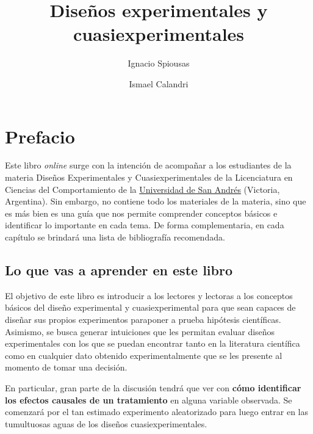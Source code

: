 \documentclass[
  letterpaper,
  DIV=11,
  numbers=noendperiod,
  oneside]{scrreprt}
\title{Diseños experimentales y cuasiexperimentales}
\author{Ignacio Spiousas \and Ismael Calandri}
\date{}
\renewcommand*\contentsname{Indice de contenidos}
\newcommand\contentsname{Indice de contenidos}
\begin{document}
\maketitle
\ifdefined\Shaded\renewenvironment{Shaded}{\begin{tcolorbox}[boxrule=0pt, interior hidden, borderline west={3pt}{0pt}{shadecolor}, frame hidden, enhanced, sharp corners, breakable]}{\end{tcolorbox}}\fi

\renewcommand*\contentsname{Índice}
{
\hypersetup{linkcolor=}
\setcounter{tocdepth}{2}
\tableofcontents
}

\hypertarget{prefacio}{%
\chapter*{Prefacio}\label{prefacio}}

Este libro \emph{online} surge con la intención de acompañar a los
estudiantes de la materia Diseños Experimentales y Cuasiexperimentales
de la Licenciatura en Ciencias del Comportamiento de la
\href{https://udesa.edu.ar/}{Universidad de San Andrés} (Victoria,
Argentina). Sin embargo, no contiene todo los materiales de la materia,
sino que es más bien es una guía que nos permite comprender conceptos
básicos e identificar lo importante en cada tema. De forma
complementaria, en cada capítulo se brindará una lista de bibliografía
recomendada.

\hypertarget{lo-que-vas-a-aprender-en-este-libro}{%
\section*{Lo que vas a aprender en este
libro}\label{lo-que-vas-a-aprender-en-este-libro}}

El objetivo de este libro es introducir a los lectores y lectoras a los
conceptos básicos del diseño experimental y cuasiexperimental para que
sean capaces de diseñar sus propios experimentos paraponer a prueba
hipótesis científicas. Asimismo, se busca generar intuiciones que les
permitan evaluar diseños experimentales con los que se puedan encontrar
tanto en la literatura científica como en cualquier dato obtenido
experimentalmente que se les presente al momento de tomar una decisión.

En particular, gran parte de la discusión tendrá que ver con
\textbf{cómo identificar los efectos causales de un
tratamiento} en alguna
variable observada. Se comenzará por el tan estimado experimento
aleatorizado para luego entrar en las tumultuosas aguas de los diseños
cuasiexperimentales.
\end{document}
